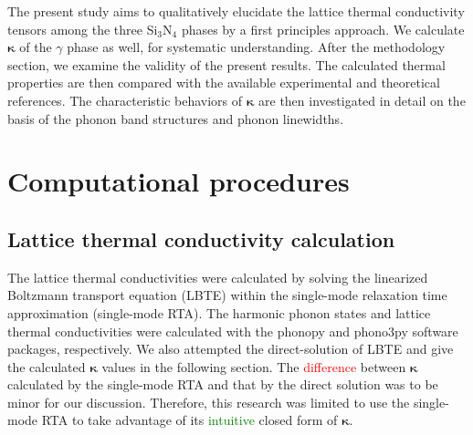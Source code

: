 \documentclass[twocolumn,amsmath,amssymb,a4paper,prb,superscriptaddress,floatfix]{revtex4-1}
\begin{document}
The present study aims to qualitatively elucidate the lattice thermal
conductivity tensors among the three Si$_3$N$_4$ phases by a first principles
approach.  We calculate $\boldsymbol{\kappa}$ of the $\gamma$ phase as well, for
systematic understanding. After the methodology section, we examine the validity
of the present results. The calculated thermal properties are then compared with
the available experimental and theoretical references.  The characteristic
behaviors of  $\boldsymbol{\kappa}$ are then investigated in detail on the basis
of the phonon band structures and phonon linewidths.

\section{Computational procedures}

\subsection{Lattice thermal conductivity calculation}

The lattice thermal conductivities were calculated by solving the linearized
Boltzmann transport equation (LBTE) within the single-mode relaxation time
approximation (single-mode RTA).  The harmonic phonon states and lattice thermal
conductivities were calculated with the phonopy\cite{phonopy} and
phono3py\cite{phono3py} software packages, respectively.  We also attempted the
direct-solution of LBTE\cite{chaput-direct} and give the calculated
$\boldsymbol{\kappa}$ values in the following section. The
\textcolor{red}{difference} between $\boldsymbol{\kappa}$ calculated by the
single-mode RTA and that by the direct solution was to be minor for our
discussion. Therefore, this research was limited to use the single-mode RTA to
take advantage of its \textcolor{green}{intuitive} closed form of
$\boldsymbol{\kappa}$.
\end{document}
